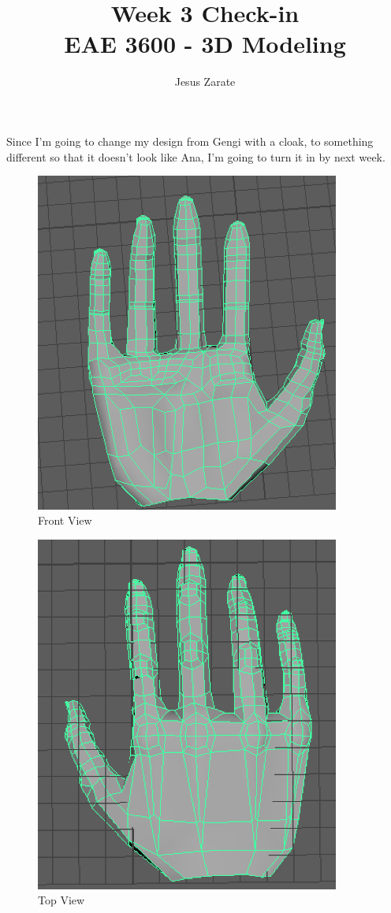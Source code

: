 \documentclass[a4paper]{article}
\title{
  Week 3 Check-in\\
  \large EAE 3600 - 3D Modeling}
\author{Jesus Zarate}
\begin{document}
\maketitle

Since I'm going to change my design from Gengi with a cloak, to something different so that it doesn't look like Ana, I'm going to turn it in by next week.

\begin{figure}[h]
\centering
\includegraphics[width=10cm]{img/bottom.png}
\caption{Front View}
\label{fig:Bottom View}
\end{figure}

\begin{figure}[h]
\centering
\includegraphics[width=10cm]{img/top.png}
\caption{Top View}
\label{fig:Top View}
\end{figure}
\end{document}
